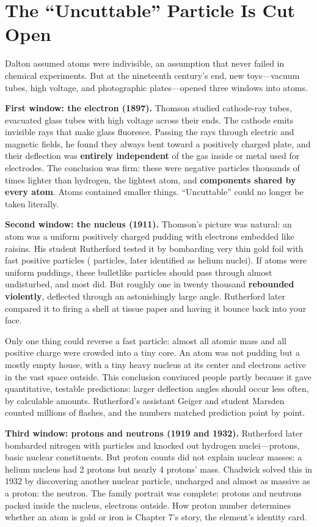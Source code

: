 \section{The ``Uncuttable'' Particle Is Cut Open}

Dalton assumed atoms were indivisible, an assumption that never failed in chemical experiments. But at the nineteenth century's end, new toys---vacuum tubes, high voltage, and photographic plates---opened three windows into atoms.

\textbf{First window: the electron (1897).} Thomson studied cathode-ray tubes, evacuated glass tubes with high voltage across their ends. The cathode emits invisible rays that make glass fluoresce. Passing the rays through electric and magnetic fields, he found they always bent toward a positively charged plate, and their deflection was \textbf{entirely independent} of the gas inside or metal used for electrodes. The conclusion was firm: these were negative particles thousands of times lighter than hydrogen, the lightest atom, and \textbf{components shared by every atom}. Atoms contained smaller things. ``Uncuttable'' could no longer be taken literally.

\textbf{Second window: the nucleus (1911).} Thomson's picture was natural: an atom was a uniform positively charged pudding with electrons embedded like raisins. His student Rutherford tested it by bombarding very thin gold foil with fast positive particles (\chem{\alpha} particles, later identified as helium nuclei). If atoms were uniform puddings, these bulletlike particles should pass through almost undisturbed, and most did. But roughly one in twenty thousand \textbf{rebounded violently}, deflected through an astonishingly large angle. Rutherford later compared it to firing a shell at tissue paper and having it bounce back into your face.

Only one thing could reverse a fast particle: almost all atomic mass and all positive charge were crowded into a tiny core. An atom was not pudding but a mostly empty house, with a tiny heavy nucleus at its center and electrons active in the vast space outside. This conclusion convinced people partly because it gave quantitative, testable predictions: larger deflection angles should occur less often, by calculable amounts. Rutherford's assistant Geiger and student Marsden counted millions of flashes, and the numbers matched prediction point by point.

\textbf{Third window: protons and neutrons (1919 and 1932).} Rutherford later bombarded nitrogen with \chem{\alpha} particles and knocked out hydrogen nuclei---protons, basic nuclear constituents. But proton counts did not explain nuclear masses: a helium nucleus had 2 protons but nearly 4 protons' mass. Chadwick solved this in 1932 by discovering another nuclear particle, uncharged and almost as massive as a proton: the neutron. The family portrait was complete: protons and neutrons packed inside the nucleus, electrons outside. How proton number determines whether an atom is gold or iron is Chapter 7's story, the element's identity card.


